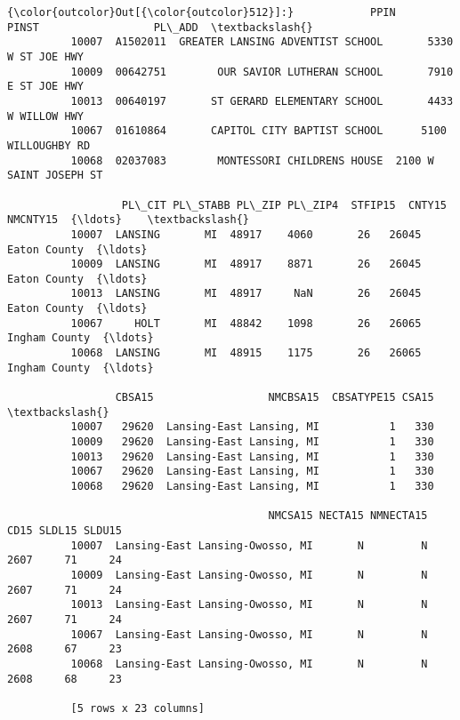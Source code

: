 \documentclass[11pt]{article}
\begin{document}
\begin{Verbatim}[commandchars=\\\{\}]
{\color{outcolor}Out[{\color{outcolor}512}]:}            PPIN                             PINST                  PL\_ADD  \textbackslash{}
          10007  A1502011  GREATER LANSING ADVENTIST SCHOOL       5330 W ST JOE HWY   
          10009  00642751        OUR SAVIOR LUTHERAN SCHOOL       7910 E ST JOE HWY   
          10013  00640197       ST GERARD ELEMENTARY SCHOOL       4433 W WILLOW HWY   
          10067  01610864       CAPITOL CITY BAPTIST SCHOOL      5100 WILLOUGHBY RD   
          10068  02037083        MONTESSORI CHILDRENS HOUSE  2100 W SAINT JOSEPH ST   
          
                  PL\_CIT PL\_STABB PL\_ZIP PL\_ZIP4  STFIP15  CNTY15       NMCNTY15  {\ldots}    \textbackslash{}
          10007  LANSING       MI  48917    4060       26   26045   Eaton County  {\ldots}     
          10009  LANSING       MI  48917    8871       26   26045   Eaton County  {\ldots}     
          10013  LANSING       MI  48917     NaN       26   26045   Eaton County  {\ldots}     
          10067     HOLT       MI  48842    1098       26   26065  Ingham County  {\ldots}     
          10068  LANSING       MI  48915    1175       26   26065  Ingham County  {\ldots}     
          
                 CBSA15                  NMCBSA15  CBSATYPE15 CSA15  \textbackslash{}
          10007   29620  Lansing-East Lansing, MI           1   330   
          10009   29620  Lansing-East Lansing, MI           1   330   
          10013   29620  Lansing-East Lansing, MI           1   330   
          10067   29620  Lansing-East Lansing, MI           1   330   
          10068   29620  Lansing-East Lansing, MI           1   330   
          
                                         NMCSA15 NECTA15 NMNECTA15  CD15 SLDL15 SLDU15  
          10007  Lansing-East Lansing-Owosso, MI       N         N  2607     71     24  
          10009  Lansing-East Lansing-Owosso, MI       N         N  2607     71     24  
          10013  Lansing-East Lansing-Owosso, MI       N         N  2607     71     24  
          10067  Lansing-East Lansing-Owosso, MI       N         N  2608     67     23  
          10068  Lansing-East Lansing-Owosso, MI       N         N  2608     68     23  
          
          [5 rows x 23 columns]
\end{Verbatim}
            
\end{document}
